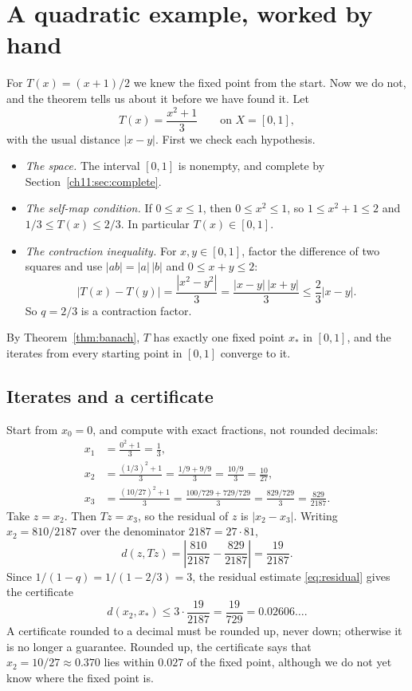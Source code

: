 \section{A quadratic example, worked by hand}\label{ch12:sec:example}
For $T(x)=(x+1)/2$ we knew the fixed point from the start. Now we do not, and the theorem tells us about it before we have found it. Let
\[
T(x)=\frac{x^2+1}{3}\qquad\text{on }X=[0,1],
\]
with the usual distance $|x-y|$. First we check each hypothesis.
\begin{itemize}
\item \emph{The space.} The interval $[0,1]$ is nonempty, and complete by Section~\ref{ch11:sec:complete}.
\item \emph{The self-map condition.} If $0\le x\le1$, then $0\le x^2\le1$, so $1\le x^2+1\le2$ and $1/3\le T(x)\le2/3$. In particular $T(x)\in[0,1]$.
\item \emph{The contraction inequality.} For $x,y\in[0,1]$, factor the difference of two squares and use $|ab|=|a|\,|b|$ and $0\le x+y\le2$:
\[
|T(x)-T(y)|=\frac{|x^2-y^2|}{3}=\frac{|x-y|\,|x+y|}{3}\le\frac23|x-y|.
\]
So $q=2/3$ is a contraction factor.
\end{itemize}
By Theorem~\ref{thm:banach}, $T$ has exactly one fixed point $x_*$ in $[0,1]$, and the iterates from every starting point in $[0,1]$ converge to it.

\subsection*{Iterates and a certificate}
Start from $x_0=0$, and compute with exact fractions, not rounded decimals:
\begin{align*}
x_1&=\frac{0^2+1}{3}=\frac13,\\
x_2&=\frac{(1/3)^2+1}{3}=\frac{1/9+9/9}{3}=\frac{10/9}{3}=\frac{10}{27},\\
x_3&=\frac{(10/27)^2+1}{3}=\frac{100/729+729/729}{3}=\frac{829/729}{3}=\frac{829}{2187}.
\end{align*}
Take $z=x_2$. Then $Tz=x_3$, so the residual of $z$ is $|x_2-x_3|$. Writing $x_2=810/2187$ over the denominator $2187=27\cdot81$,
\[
d(z,Tz)=\left|\frac{810}{2187}-\frac{829}{2187}\right|=\frac{19}{2187}.
\]
Since $1/(1-q)=1/(1-2/3)=3$, the residual estimate \eqref{eq:residual} gives the certificate
\[
d(x_2,x_*)\le3\cdot\frac{19}{2187}=\frac{19}{729}=0.02606\ldots.
\]
A certificate rounded to a decimal must be rounded up, never down; otherwise it is no longer a guarantee. Rounded up, the certificate says that $x_2=10/27\approx0.370$ lies within $0.027$ of the fixed point, although we do not yet know where the fixed point is.

